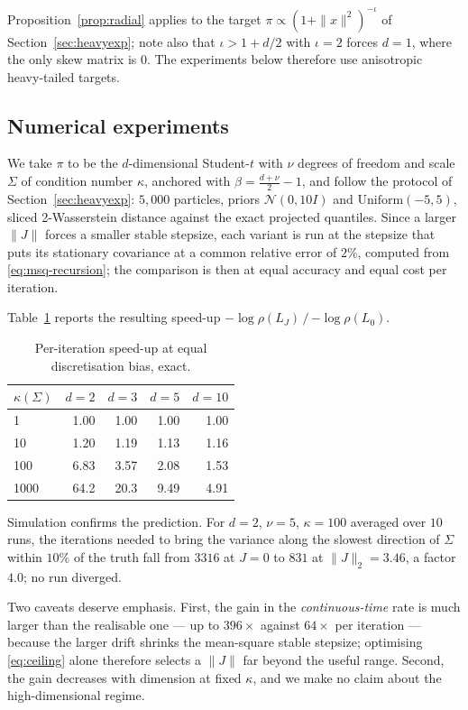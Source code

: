 Proposition~\ref{prop:radial} applies to the target
$\pi\propto(1+\|x\|^2)^{-\iota}$ of Section~\ref{sec:heavyexp}; note also that
$\iota>1+d/2$ with $\iota=2$ forces $d=1$, where the only skew matrix is $0$.
The experiments below therefore use anisotropic heavy-tailed targets.

\subsection{Numerical experiments}

We take $\pi$ to be the $d$-dimensional Student-$t$ with $\nu$ degrees of
freedom and scale $\Sigma$ of condition number $\kappa$, anchored with
$\beta=\tfrac{d+\nu}{2}-1$, and follow the protocol of
Section~\ref{sec:heavyexp}: $5{,}000$ particles, priors $\mathcal N(0,10I)$ and
$\mathrm{Uniform}(-5,5)$, sliced 2-Wasserstein distance against the exact
projected quantiles.  Since a larger $\|J\|$ forces a smaller stable stepsize,
each variant is run at the stepsize that puts its stationary covariance at a
common relative error of $2\%$, computed from \eqref{eq:msq-recursion}; the
comparison is then at equal accuracy and equal cost per iteration.

Table~\ref{tab:skew-speedup} reports the resulting speed-up
$-\log\rho(L_J)\,/\,{-\log\rho(L_0)}$.

\begin{table}[t]
\centering
\caption{Per-iteration speed-up at equal discretisation bias, exact.}
\label{tab:skew-speedup}
\begin{tabular}{lrrrr}
\toprule
$\kappa(\Sigma)$ & $d=2$ & $d=3$ & $d=5$ & $d=10$\\
\midrule
1    & 1.00 & 1.00 & 1.00 & 1.00\\
10   & 1.20 & 1.19 & 1.13 & 1.16\\
100  & 6.83 & 3.57 & 2.08 & 1.53\\
1000 & 64.2 & 20.3 & 9.49 & 4.91\\
\bottomrule
\end{tabular}
\end{table}

Simulation confirms the prediction.  For $d=2$, $\nu=5$, $\kappa=100$ averaged
over $10$ runs, the iterations needed to bring the variance along the slowest
direction of $\Sigma$ within $10\%$ of the truth fall from $3316$ at $J=0$ to
$831$ at $\|J\|_2=3.46$, a factor $4.0$; no run diverged.

Two caveats deserve emphasis.  First, the gain in the \emph{continuous-time}
rate is much larger than the realisable one --- up to $396\times$ against
$64\times$ per iteration --- because the larger drift shrinks the mean-square
stable stepsize; optimising \eqref{eq:ceiling} alone therefore selects a
$\|J\|$ far beyond the useful range.  Second, the gain decreases with dimension
at fixed $\kappa$, and we make no claim about the high-dimensional regime.

